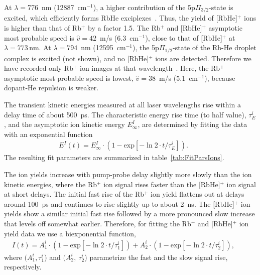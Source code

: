 At $\lambda=$776~nm (12887~cm$^{-1}$), a higher contribution of the 5p$\Pi_{3/2}$-state is excited, which efficiently forms RbHe exciplexes~\cite{Bruehl:2001}. Thus, the yield of [RbHe]$^+$ ions is higher than that of Rb$^+$ by a factor 1.5. The Rb$^+$ and [RbHe]$^+$ asymptotic most probable speed is $\hat{v}=42$~m/s (6.3~cm$^{-1}$), close to that of [RbHe]$^+$ at $\lambda=773$\,nm. At $\lambda=794$~nm (12595~cm$^{-1}$), the 5p$\Pi_{1/2}$-state of the Rb-He droplet complex is excited (not shown), and no [RbHe]$^+$ ions are detected. Therefore we have recorded only Rb$^+$ ion images at that wavelength~\cite{Vangerow:2017}. Here, the Rb$^+$ asymptotic most probable speed is lowest, $\hat{v}=38$~m/s (5.1~cm$^{-1}$), because dopant-He repulsion is weaker.

The transient kinetic energies measured at all laser wavelengths rise within a delay time of about 500~ps. 
The characteristic energy rise time (to half value), $\tau^i_E$, and the asymptotic ion kinetic energy $E_\infty^I$, are determined by fitting the data with an exponential function
\begin{align} 
E^I(t)=E_\infty^I\cdot\left(1-\mathrm{exp}[-\ln2\cdot t/\tau^i_E]\right).\qquad
\label{E(t)}
\end{align} 
The resulting fit parameters are summarized in table~\ref{tab:FitParsIons}. 
 
The ion yields increase with pump-probe delay slightly more slowly than the ion kinetic energies, where the Rb$^+$ ion signal rises faster than the [RbHe]$^+$ ion signal at short delays. The initial fast rise of the Rb$^+$ ion yield flattens out at delays around 100~ps and continues to rise slightly up to about 2~ns. The [RbHe]$^+$ ion yields show a similar initial fast rise followed by a more pronounced slow increase that levels off somewhat earlier. Therefore, for fitting the Rb$^+$ and [RbHe]$^+$ ion yield data we use a biexponential function,
\begin{align} 
I(t)=A^i_1\cdot\left(1-\mathrm{exp}[-\ln2\cdot t/\tau^i_1]\right)+A^i_2\cdot\left(1-\mathrm{exp}[-\ln2\cdot t/\tau^i_2]\right),\qquad
\label{I_Rb}
\end{align}
where $(A^i_1,\tau^i_1$) and $(A^i_2,~\tau^i_2$) parametrize the fast and the slow signal rise, respectively.

